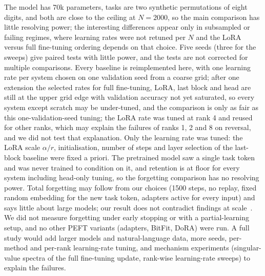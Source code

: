 The model has 70k parameters, tasks are two synthetic permutations of eight digits, and both are close to the ceiling at $N=2000$, so the main comparison has little resolving power; the interesting differences appear only in subsampled or failing regimes, where learning rates were not retuned per $N$ and the LoRA versus full fine-tuning ordering depends on that choice. Five seeds (three for the sweeps) give paired tests with little power, and the tests are not corrected for multiple comparisons. Every baseline is reimplemented here, with one learning rate per system chosen on one validation seed from a coarse grid; after one extension the selected rates for full fine-tuning, LoRA, last block and head are still at the upper grid edge with validation accuracy not yet saturated, so every system except scratch may be under-tuned, and the comparison is only as fair as this one-validation-seed tuning; the LoRA rate was tuned at rank 4 and reused for other ranks, which may explain the failures of ranks 1, 2 and 8 on reversal, and we did not test that explanation. Only the learning rate was tuned: the LoRA scale $\alpha/r$, initialisation, number of steps and layer selection of the last-block baseline were fixed a priori. The pretrained model saw a single task token and was never trained to condition on it, and retention is at floor for every system including head-only tuning, so the forgetting comparison has no resolving power. Total forgetting may follow from our choices (1500 steps, no replay, fixed random embedding for the new task token, adapters active for every input) and says little about large models; our result does not contradict findings at scale~\cite{biderman2024lora}. We did not measure forgetting under early stopping or with a partial-learning setup, and no other PEFT variants (adapters, BitFit, DoRA) were run. A full study would add larger models and natural-language data, more seeds, per-method and per-rank learning-rate tuning, and mechanism experiments (singular-value spectra of the full fine-tuning update, rank-wise learning-rate sweeps) to explain the failures.
